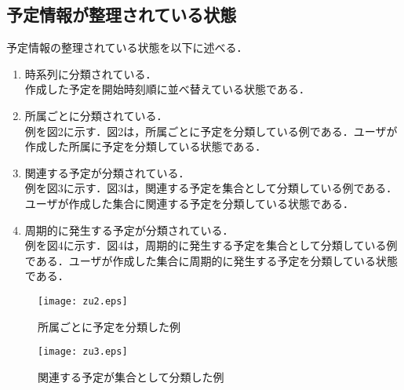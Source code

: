 \documentclass[fleqn, 14pt]{extarticlej}
\begin{document}
\subsection{予定情報が整理されている状態}
予定情報の整理されている状態を以下に述べる．
\begin{enumerate}
	\item 時系列に分類されている．\\
			作成した予定を開始時刻順に並べ替えている状態である．
	
	\item 所属ごとに分類されている．\\
          例を図2に示す．図2は，所属ごとに予定を分類している例である．ユーザが作成した所属に予定を分類している状態である．
 

	\item 関連する予定が分類されている．\\
          例を図3に示す．図3は，関連する予定を集合として分類している例である．ユーザが作成した集合に関連する予定を分類している状態である．
          
	\item 周期的に発生する予定が分類されている．\\
          例を図4に示す．図4は，周期的に発生する予定を集合として分類している例である．ユーザが作成した集合に周期的に発生する予定を分類している状態である．
          
\end{enumerate}

\begin{figure}
  \begin{center}
    \texttt{[image: zu2.eps]}
    \caption{所属ごとに予定を分類した例}
  \end{center}
\end{figure}

\begin{figure}
  \begin{center}
    \texttt{[image: zu3.eps]}
    \caption{関連する予定が集合として分類した例}
  \end{center}
\end{figure}
\end{document}
